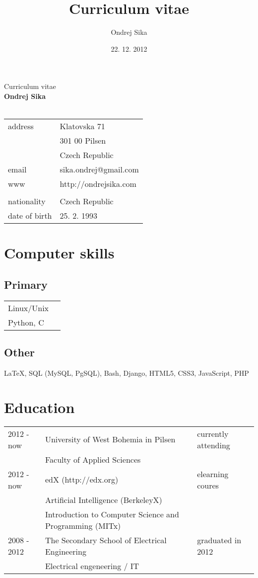 \documentclass[12pt,a4paper]{article}
\title{Curriculum vitae}
\author{Ondrej Sika}
\date{22. 12. 2012}
\begin{document}
\begin{center}
{\Large Curriculum vitae}\\
\vspace*{1cm}
{\LARGE \bf Ondrej Sika}\\
\hrulefill\\
\vspace*{0.2cm}
\begin{tabular}{l l}
address & Klatovska 71\\
 & 301 00 Pilsen\\
 & Czech Republic\\
email & sika.ondrej@gmail.com\\
www & http://ondrejsika.com\\
\\
nationality & Czech Republic\\
date of birth & 25. 2. 1993\\
\end{tabular}
\end{center}

\section*{Computer skills}
\subsection*{Primary}
\begin{tabular}{@{}ll}
Linux/Unix & \\
Python, C & \\
\end{tabular}

\subsection*{Other}
LaTeX, SQL (MySQL, PgSQL), Bash, Django, HTML5, CSS3, JavaScript, PHP

\section*{Education}
\begin{tabular}{@{}p{2cm}ll}
2012 - now & University of West Bohemia in Pilsen  & currently attending\\
 & Faculty of Applied Sciences & \\
2012 - now & edX (http://edx.org) & elearning coures\\
 & Artificial Intelligence (BerkeleyX) & \\
 & Introduction to Computer Science and Programming (MITx) & \\
2008 - 2012 & The Secondary School of Electrical Engineering & graduated in 2012\\
 & Electrical engeneering / IT & \\
\end{tabular}
\end{document}
